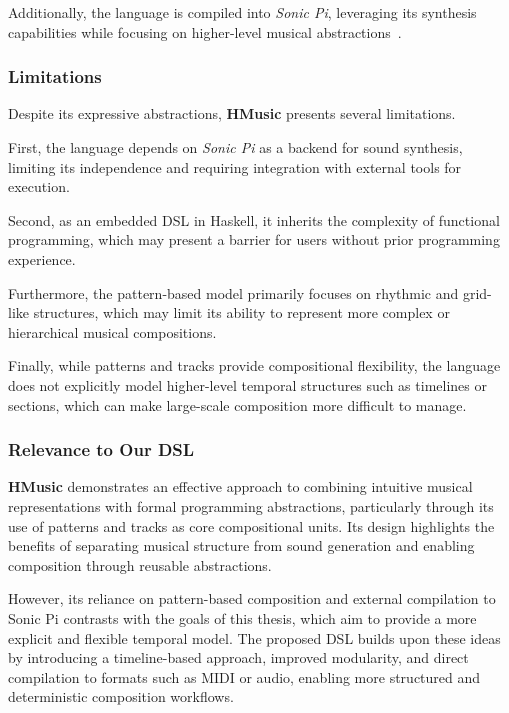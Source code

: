 Additionally, the language is compiled into \textit{Sonic Pi}, leveraging its synthesis capabilities while focusing
on higher-level musical abstractions~\cite{Du_Bois_Ribeiro_2019}.


\subsubsection{Limitations}

Despite its expressive abstractions, \textbf{HMusic} presents several limitations.

First, the language depends on \textit{Sonic Pi} as a backend for sound synthesis, limiting its independence and
requiring integration with external tools for execution.

Second, as an embedded DSL in Haskell, it inherits the complexity of functional programming, which may present a barrier
for users without prior programming experience.

Furthermore, the pattern-based model primarily focuses on rhythmic and grid-like structures, which may limit its ability
to represent more complex or hierarchical musical compositions.

Finally, while patterns and tracks provide compositional flexibility, the language does not explicitly model
higher-level temporal structures such as timelines or sections, which can make large-scale composition more difficult to
manage.


\subsubsection{Relevance to Our DSL}

\textbf{HMusic} demonstrates an effective approach to combining intuitive musical representations with formal
programming abstractions, particularly through its use of patterns and tracks as core compositional units.
Its design highlights the benefits of separating musical structure from sound generation and enabling composition
through reusable abstractions.

However, its reliance on pattern-based composition and external compilation to Sonic Pi contrasts with the goals of
this thesis, which aim to provide a more explicit and flexible temporal model.
The proposed DSL builds upon these ideas by introducing a timeline-based approach, improved modularity, and direct
compilation to formats such as MIDI or audio, enabling more structured and deterministic composition workflows.
